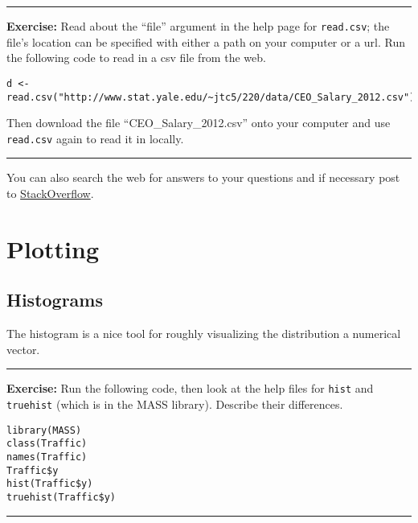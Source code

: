 \documentclass[]{book}
\theoremstyle{definition}
\theoremstyle{definition}
\theoremstyle{definition}
\theoremstyle{remark}
\begin{document}
\begin{center}\rule{0.5\linewidth}{\linethickness}\end{center}

\textbf{Exercise:} Read about the ``file'' argument in the help page for
\texttt{read.csv}; the file's location can be specified with either a
path on your computer or a url. Run the following code to read in a csv
file from the web.

\begin{verbatim}
d <- read.csv("http://www.stat.yale.edu/~jtc5/220/data/CEO_Salary_2012.csv")
\end{verbatim}

Then download the file ``CEO\_Salary\_2012.csv'' onto your computer and
use \texttt{read.csv} again to read it in locally.

\begin{center}\rule{0.5\linewidth}{\linethickness}\end{center}

You can also search the web for answers to your questions and if
necessary post to
\href{https://stackoverflow.com/tags/r/info}{StackOverflow}.

\hypertarget{plotting}{%
\chapter{Plotting}\label{plotting}}

\hypertarget{histograms}{%
\section{Histograms}\label{histograms}}

The histogram is a nice tool for roughly visualizing the distribution a
numerical vector.

\begin{center}\rule{0.5\linewidth}{\linethickness}\end{center}

\textbf{Exercise:} Run the following code, then look at the help files
for \texttt{hist} and \texttt{truehist} (which is in the MASS library).
Describe their differences.

\begin{verbatim}
library(MASS)
class(Traffic)
names(Traffic)
Traffic$y
hist(Traffic$y)
truehist(Traffic$y)
\end{verbatim}

\begin{center}\rule{0.5\linewidth}{\linethickness}\end{center}
\end{document}
